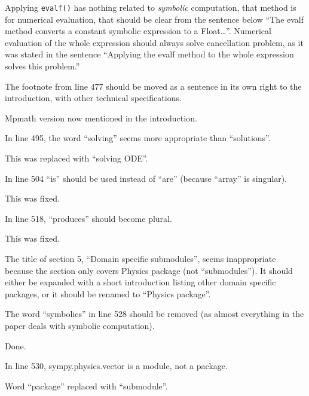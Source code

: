 \documentclass[answers,12pt]{exam}
\begin{document}
\begin{questions}
\begin{solution}
Applying \texttt{evalf()} has nothing related to \emph{symbolic} computation,
that method is for numerical evaluation, that should be clear from
the sentence below ``The evalf method converts a constant symbolic expression
to a Float\dots''.  Numerical evaluation of the whole expression should
always solve cancellation problem, as it was stated in the sentence
``Applying the evalf method to the whole expression solves this problem.''
\end{solution}

\question The footnote from line 477 should be moved as a sentence in its own right to the introduction, with other technical specifications.
\begin{solution}
Mpmath version now mentioned in the introduction.
\end{solution}

\question In line 495, the word ``solving'' seems more appropriate than ``solutions''.
\begin{solution}
This was replaced with ``solving ODE''.
\end{solution}

\question In line 504 ``is'' should be used instead of ``are'' (because ``array'' is singular).
\begin{solution}
This was fixed.
\end{solution}

\question In line 518, ``produces'' should become plural.
\begin{solution}
This was fixed.
\end{solution}

\question The title of section 5, ``Domain specific submodules'', seems inappropriate because the section only covers Physics package (not ``submodules''). It should either be expanded with a short introduction listing other domain specific packages, or it should be renamed to ``Physics package''.
\begin{solution}

\end{solution}

\question The word ``symbolics'' in line 528 should be removed (as almost everything in the paper deals with symbolic computation).
\begin{solution}
Done.
\end{solution}

\question In line 530, sympy.physics.vector is a module, not a package.
\begin{solution}
Word ``package'' replaced with ``submodule''.
\end{solution}


\end{questions}
\end{document}
